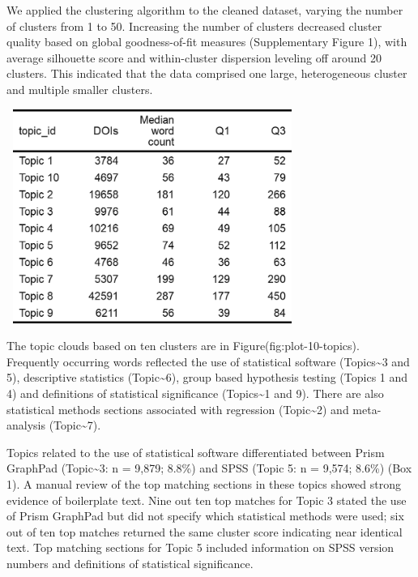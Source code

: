 \documentclass[12pt]{article}
\begin{document}
We applied the clustering algorithm to the cleaned dataset, varying the
number of clusters from 1 to 50. Increasing the number of clusters
decreased cluster quality based on global goodness-of-fit measures
(Supplementary Figure 1), with average silhouette score and
within-cluster dispersion leveling off around 20 clusters. This
indicated that the data comprised one large, heterogeneous cluster and
multiple smaller clusters.

\includegraphics[width=3.75in,height=2.75in,keepaspectratio]{asa_template_files/figure-latex/unnamed-chunk-4-1.png}

The topic clouds based on ten clusters are in
Figure\textasciitilde@ref(fig:plot-10-topics). Frequently occurring
words reflected the use of statistical software (Topics\textasciitilde3
and 5), descriptive statistics (Topic\textasciitilde6), group based
hypothesis testing (Topics 1 and 4) and definitions of statistical
significance (Topics\textasciitilde1 and 9). There are also statistical
methods sections associated with regression (Topic\textasciitilde2) and
meta-analysis (Topic\textasciitilde7).

Topics related to the use of statistical software differentiated between
Prism GraphPad (Topic\textasciitilde3: n = 9,879; 8.8\%) and SPSS (Topic
5: n = 9,574; 8.6\%) (Box 1). A manual review of the top matching
sections in these topics showed strong evidence of boilerplate text.
Nine out ten top matches for Topic 3 stated the use of Prism GraphPad
but did not specify which statistical methods were used; six out of ten
top matches returned the same cluster score indicating near identical
text. Top matching sections for Topic 5 included information on SPSS
version numbers and definitions of statistical significance.



\end{document}
